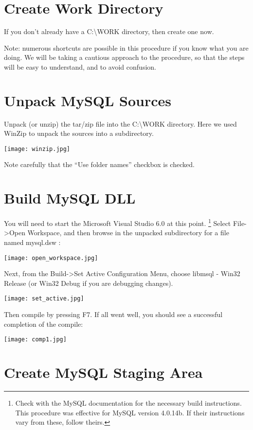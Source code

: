 \documentclass[english]{report}
\begin{document}
\section{Create Work Directory}

If you don't already have a C:\textbackslash{}WORK directory, then
create one now.

Note: numerous shortcuts are possible in this procedure if you know
what you are doing. We will be taking a cautious approach to the procedure,
so that the steps will be easy to understand, and to avoid confusion.


\section{Unpack MySQL Sources}

Unpack (or unzip) the tar/zip file into the C:\textbackslash{}WORK
directory. Here we used WinZip to unpack the sources into a subdirectory.

\texttt{[image: winzip.jpg]}

Note carefully that the {}``Use folder names'' checkbox is checked.


\section{Build MySQL DLL}

You will need to start the Microsoft Visual Studio 6.0 at this point.%
\footnote{Check with the MySQL documentation for the necessary build instructions.
This procedure was effective for MySQL version 4.0.14b. If their instructions
vary from these, follow theirs.%
} Select File->Open Workspace, and then browse in the unpacked subdirectory
for a file named mysql.dsw :

\texttt{[image: open\_workspace.jpg]}

Next, from the Build->Set Active Configuration Menu, choose libmsql
- Win32 Release (or Win32 Debug if you are debugging changes).

\texttt{[image: set\_active.jpg]}

Then compile by pressing F7. If all went well, you should see a successful
completion of the compile:

\texttt{[image: comp1.jpg]}


\section{Create MySQL Staging Area}
\end{document}
